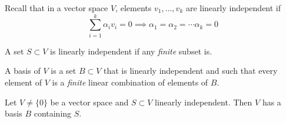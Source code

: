 \documentclass{article}
\begin{document}
Recall that in a vector space $V$, elements $v_1, \dotsc, v_k$ are linearly independent if
\begin{equation*}
    \sum_{i=1}^k \alpha_i v_i = 0 \implies \alpha_1 = \alpha_2 = \dotsb \alpha_k = 0
\end{equation*}

A set $S \subset V$ is linearly independent if any \emph{finite} subset is.

A basis of $V$ is a set $B \subset V$ that is linearly independent and such that every element of $V$ is a \emph{finite} linear combination of elements of $B$.

\begin{prop}
    Let $V \neq \{0\}$ be a vector space and $S \subset V$ linearly independent. Then $V$ has a basis $B$ containing $S$.
\end{prop}
\end{document}
